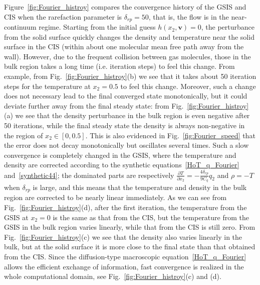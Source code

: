 Figure~\ref{fig:Fourier_histroy} compares the convergence history of the GSIS and CIS when the rarefaction parameter is $\delta_{rp}=50$, that is, the flow is in the near-continuum regime. Starting from the initial guess $h(x_2,\bm{v})=0$, the perturbance from the solid surface quickly changes the density and temperature near the solid surface in the CIS (within about one molecular mean free path away from the wall). However, due to the frequent collision between gas molecules, those in the bulk region takes a long time (i.e. iteration steps) to feel this change. From example, from Fig.~\ref{fig:Fourier_histroy}(b) we see that it takes about 50 iteration steps for the temperature at $x_2=0.5$ to feel this change. Moreover, such a change does not necessary lead to the final converged state monotonically, but it could deviate further away from the final steady state: from Fig.~\ref{fig:Fourier_histroy}(a) we see that the density perturbance in the bulk region is even negative after 50 iterations, while the final steady state the density is always non-negative in the region of $x_2\in[0, 0.5]$. This is also evidenced in Fig.~\ref{fig:Fourier_speed} that the error does not decay monotonically but oscillates several times. Such a slow convergence is completely changed in the GSIS, where the temperature and density are corrected according to the synthetic equations~\eqref{HoT_q_Fourier} and~\eqref{synthetic44}; the dominated parts are respectively $\frac{\partial T}{\partial x_2}=-\frac{4\delta_{rp}}{9C_q}q_{2}$ and $\rho=-T$ when $\delta_{rp}$ is large, and this means that the temperature and density in the bulk region are corrected to be nearly linear immediately. As we can see from Fig.~\ref{fig:Fourier_histroy}(d), after the first iteration, the temperature from the GSIS at $x_2=0$ is the same as that from the CIS, but the temperature from the GSIS in the bulk region varies linearly, while that from the CIS is still zero. From Fig.~\ref{fig:Fourier_histroy}(c) we see that the density also varies linearly in the bulk, but at the solid surface it is more close to the final state than that obtained from the CIS. Since the diffusion-type  macroscopic equation~\eqref{HoT_q_Fourier} allows the efficient exchange of information, fast convergence is realized in the whole computational domain, see Fig.~\ref{fig:Fourier_histroy}(c) and (d).	




